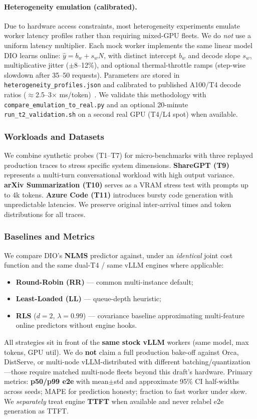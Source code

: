 \documentclass[10pt,twocolumn,letterpaper]{article}
\begin{document}
\paragraph{Heterogeneity emulation (calibrated).}
Due to hardware access constraints, most heterogeneity experiments emulate worker latency profiles rather than requiring mixed-GPU fleets. We do \emph{not} use a uniform latency multiplier. Each mock worker implements the same linear model DIO learns online: $\hat{y} = b_w + s_w N$, with distinct intercept $b_w$ and decode slope $s_w$, multiplicative jitter ($\pm$8--12\%), and optional thermal-throttle ramps (step-wise slowdown after 35--50 requests). Parameters are stored in \texttt{heterogeneity\_profiles.json} and calibrated to published A100/T4 decode ratios ($\approx$2.5--3$\times$ ms/token)~\cite{nexussched}. We validate this methodology with \texttt{compare\_emulation\_to\_real.py} and an optional 20-minute \texttt{run\_t2\_validation.sh} on a second real GPU (T4/L4 spot) when available.

\subsubsection{Workloads and Datasets}
We combine synthetic probes (T1--T7) for micro-benchmarks with three replayed production traces to stress specific system dimensions. \textbf{ShareGPT (T9)} represents a multi-turn conversational workload with high output variance. \textbf{arXiv Summarization (T10)} serves as a VRAM stress test with prompts up to 4k tokens. \textbf{Azure Code (T11)} introduces bursty code generation with unpredictable latencies. We preserve original inter-arrival times and token distributions for all traces.

\subsubsection{Baselines and Metrics}
\label{sec:baselines}
We compare DIO's \textbf{NLMS} predictor against, under an \emph{identical} joint cost function and the same dual-T4 / same vLLM engines where applicable:
\begin{itemize}
    \item \textbf{Round-Robin (RR)} --- common multi-instance default;
    \item \textbf{Least-Loaded (LL)} --- queue-depth heuristic;
    \item \textbf{RLS} ($d{=}2$, $\lambda{=}0.99$) --- covariance baseline approximating multi-feature online predictors without engine hooks.
\end{itemize}
All strategies sit in front of the \textbf{same stock vLLM} workers (same model, max tokens, GPU util). We do \textbf{not} claim a full production bake-off against Orca, DistServe, or multi-node vLLM-distributed with different batching/quantization---those require matched multi-node fleets beyond this draft's hardware. Primary metrics: \textbf{p50/p99 e2e} with mean$\pm$std and approximate 95\% CI half-widths across seeds; MAPE for prediction honesty; fraction to fast worker under skew. We \emph{separately} treat engine \textbf{TTFT} when available and never relabel e2e generation as TTFT.
\end{document}
